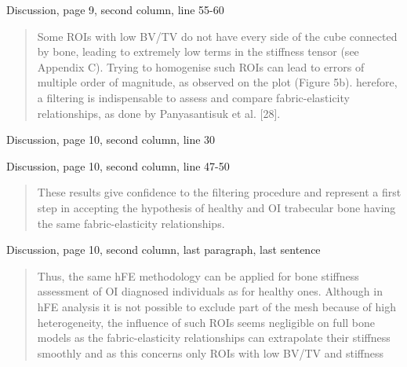 \documentclass{AR2RC}
\begin{document}
Discussion, page 9, second column, line 55-60
\begin{quote}
	Some ROIs with low BV/TV do not have every side of the cube connected by bone, leading to extremely low terms in the stiffness tensor (see Appendix C). Trying to homogenise such ROIs can lead to errors of multiple order of magnitude, as observed on the plot (Figure 5b). herefore, a filtering  is indispensable to assess and compare fabric-elasticity relationships, as done by Panyasantisuk et al. [28].
\end{quote}

\newpage
Discussion, page 10, second column, line 30
\begin{quote}
\end{quote}

Discussion, page 10, second column, line 47-50
\begin{quote}
	These results give confidence to the filtering procedure and represent a first step in accepting the hypothesis of healthy and OI trabecular bone having the same fabric-elasticity relationships. 
\end{quote}

Discussion, page 10, second column, last paragraph, last sentence
\begin{quote}
	Thus, the same hFE methodology can be applied for bone stiffness assessment of OI diagnosed individuals as for healthy ones. Although in hFE analysis it is not possible to exclude part of the mesh because of high heterogeneity, the influence of such ROIs seems negligible on full bone models as the fabric-elasticity relationships can extrapolate their stiffness smoothly and as this concerns only ROIs with low BV/TV and stiffness
\end{quote}
\end{document}
